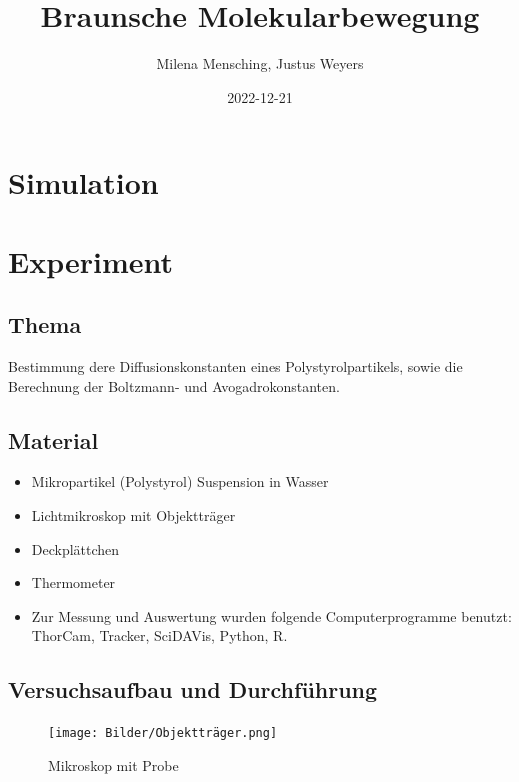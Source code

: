 \documentclass[
  9pt,
]{article}
\title{Braunsche Molekularbewegung}
\author{Milena Mensching, Justus Weyers}
\date{2022-12-21}
\begin{document}
\maketitle

\hypertarget{simulation}{%
\section{Simulation}\label{simulation}}

\hypertarget{experiment}{%
\section{Experiment}\label{experiment}}

\hypertarget{thema}{%
\subsection{Thema}\label{thema}}

Bestimmung dere Diffusionskonstanten eines Polystyrolpartikels, sowie
die Berechnung der Boltzmann- und Avogadrokonstanten.

\hypertarget{material}{%
\subsection{Material}\label{material}}

\begin{itemize}
\item{Mikropartikel (Polystyrol) Suspension in Wasser}
\item{Lichtmikroskop mit Objektträger}
\item{Deckplättchen}
\item{Thermometer}
\item{Zur Messung und Auswertung wurden folgende Computerprogramme benutzt: ThorCam, Tracker, SciDAVis, Python, R.}
\end{itemize}

\hypertarget{versuchsaufbau-und-durchfuxfchrung}{%
\subsection{Versuchsaufbau und
Durchführung}\label{versuchsaufbau-und-durchfuxfchrung}}

\begin{figure}
\centering
\texttt{[image: Bilder/Objektträger.png]}
\caption{Mikroskop mit Probe}
\end{figure}
\end{document}

